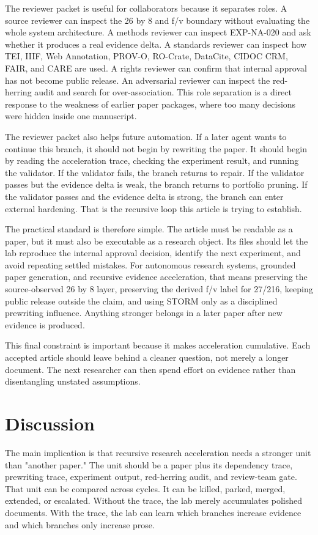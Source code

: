 \documentclass[sigconf,nonacm]{acmart}
\begin{document}
The reviewer packet is useful for collaborators because it separates roles. A
source reviewer can inspect the 26 by 8 and f/v boundary without evaluating the
whole system architecture. A methods reviewer can inspect EXP-NA-020 and ask
whether it produces a real evidence delta. A standards reviewer can inspect how
TEI, IIIF, Web Annotation, PROV-O, RO-Crate, DataCite, CIDOC CRM, FAIR, and CARE
are used. A rights reviewer can confirm that internal approval has not become
public release. An adversarial reviewer can inspect the red-herring audit and
search for over-association. This role separation is a direct response to the
weakness of earlier paper packages, where too many decisions were hidden inside
one manuscript.

The reviewer packet also helps future automation. If a later agent wants to
continue this branch, it should not begin by rewriting the paper. It should
begin by reading the acceleration trace, checking the experiment result, and
running the validator. If the validator fails, the branch returns to repair. If
the validator passes but the evidence delta is weak, the branch returns to
portfolio pruning. If the validator passes and the evidence delta is strong, the
branch can enter external hardening. That is the recursive loop this article is
trying to establish.

The practical standard is therefore simple. The article must be readable as a
paper, but it must also be executable as a research object. Its files should let
the lab reproduce the internal approval decision, identify the next experiment,
and avoid repeating settled mistakes. For autonomous research systems, grounded paper generation, and recursive evidence acceleration, that means preserving the
source-observed 26 by 8 layer, preserving the derived f/v label for 27/216,
keeping public release outside the claim, and using STORM only as a disciplined
prewriting influence. Anything stronger belongs in a later paper after new
evidence is produced.

This final constraint is important because it makes acceleration cumulative.
Each accepted article should leave behind a cleaner question, not merely a
longer document. The next researcher can then spend effort on evidence rather
than disentangling unstated assumptions.


\section{Discussion}
The main implication is that recursive research acceleration needs a stronger
unit than "another paper." The unit should be a paper plus its dependency trace,
prewriting trace, experiment output, red-herring audit, and review-team gate.
That unit can be compared across cycles. It can be killed, parked, merged,
extended, or escalated. Without the trace, the lab merely accumulates polished
documents. With the trace, the lab can learn which branches increase evidence
and which branches only increase prose.
\end{document}
